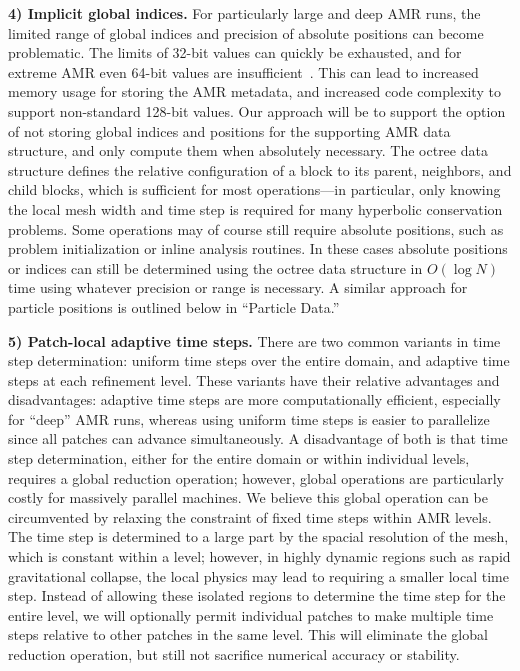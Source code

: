 \documentclass[11pt,letterpaper]{article}
\begin{document}
\textbf{4) Implicit global indices.}  For particularly large and deep
AMR runs, the limited range of global indices and precision of
absolute positions can become problematic.  The limits of 32-bit
values can quickly be exhausted, and for extreme AMR even 64-bit
values are insufficient~\cite{BrAb01}.  This can lead to increased
memory usage for storing the AMR metadata, and increased code
complexity to support non-standard 128-bit values.  Our approach will
be to support the option of not storing global indices and positions
for the supporting AMR data structure, and only compute them when
absolutely necessary.  The octree data structure defines the relative
configuration of a block to its parent, neighbors, and child blocks,
which is sufficient for most operations---in particular, only knowing
the local mesh width and time step is required for many hyperbolic
conservation problems.  Some operations may of course still require
absolute positions, such as problem initialization or inline analysis
routines.  In these cases absolute positions or indices can still be
determined using the octree data structure in $O(\log N)$ time using
whatever precision or range is necessary.  A similar approach for
particle positions is outlined below in ``Particle Data.''


\textbf{5) Patch-local adaptive time steps.} There are two common
variants in time step determination: uniform time steps over the
entire domain, and adaptive time steps at each refinement level.
These variants have their relative advantages and disadvantages:
adaptive time steps are more computationally efficient, especially for
``deep'' AMR runs, whereas using uniform time steps is easier to
parallelize since all patches can advance simultaneously.  A
disadvantage of both is that time step determination, either for the
entire domain or within individual levels, requires a global reduction
operation; however, global operations are particularly costly for
massively parallel machines.  We believe this global operation can be
circumvented by relaxing the constraint of fixed time steps within AMR
levels.  The time step is determined to a large part by the spacial
resolution of the mesh, which is constant within a level; however, in
highly dynamic regions such as rapid gravitational collapse, the local
physics may lead to requiring a smaller local time step.  Instead of
allowing these isolated regions to determine the time step for the
entire level, we will optionally permit individual patches to make
multiple time steps relative to other patches in the same level.  This
will eliminate the global reduction operation, but still not sacrifice
numerical accuracy or stability.
\end{document}
